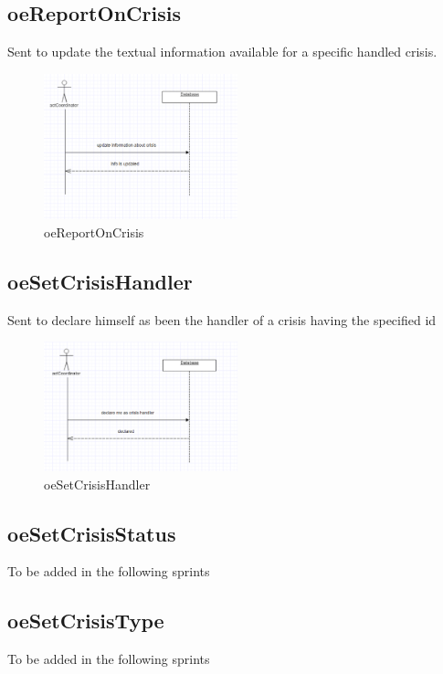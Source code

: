 \subsection{oeReportOnCrisis}
Sent to update the textual information available for a specific handled crisis.

\begin{figure}[H]
\begin{center}
\includegraphics[width=0.5\textwidth]{./images/oeReportOnCrisis.eps} 
\end{center}
\caption{oeReportOnCrisis}
\end{figure}

\subsection{oeSetCrisisHandler}
Sent to declare himself as been the handler of a crisis having the specified id

\begin{figure}[H]
\begin{center}
\includegraphics[width=0.5\textwidth]{./images/oeSetCrisisHandler.eps} 
\end{center}
\caption{oeSetCrisisHandler}
\end{figure}


\subsection{oeSetCrisisStatus}
To be added in the following sprints

\subsection{oeSetCrisisType}
To be added in the following sprints

